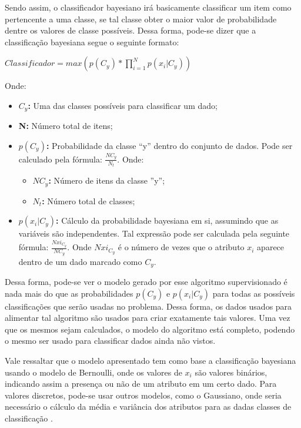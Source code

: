 Sendo assim, o classificador bayesiano irá basicamente classificar um item
como pertencente a uma classe, se tal classe obter o maior valor de
probabilidade dentre os valores de classe possíveis. Dessa forma, pode-se
dizer que a classificação bayesiana segue o seguinte formato:

$Classificador = max(p(C_{y})*\prod_{i=1}^{N}p(x_{i}|C_{y}))$

Onde:

\begin{itemize}
    \item \textbf{$C_{y}$: } Uma das classes possíveis para classificar um
    dado;
    \item \textbf{N: } Número total de itens;
    \item \textbf{$p(C_{y})$: } Probabilidade da classe ``y'' dentro do
    conjunto de dados. Pode ser calculado pela
    fórmula: $\frac{NC_{y}}{N_{t}}$.
    Onde:
      \begin{itemize}
          \item \textbf{$NC_{y}$: } Número de itens da classe ''y'';
          \item \textbf{$N_{t}$: } Número total de classes;
      \end{itemize}
    \item \textbf{$p(x_{i}|C_{y})$: } Cálculo da probabilidade bayesiana
    em si, assumindo que as variáveis são independentes. Tal expressão
    pode ser calculada pela seguinte fórmula: $\frac{Nxi_{C_{y}}}{NC_{y}}$.
    Onde $Nxi_{C_{y}}$ é o número de vezes que o atributo $x_{i}$ aparece
    dentro de um dado marcado como $C_{y}$.
\end{itemize}

Dessa forma, pode-se ver o modelo gerado por esse algoritmo supervisionado
é nada mais do que as probabilidades $p(C_{y})$ e $p(x_{i}|C_{y})$ para
todas as possíveis classificações que serão usadas no problema. Dessa forma,
os dados usados para alimentar tal algoritmo são usados para criar exatamente tais
valores. Uma vez que os mesmos sejam calculados, o modelo do algoritmo está completo,
podendo o mesmo ser usado para classificar dados ainda não vistos.

Vale ressaltar que o modelo apresentado tem como base a classificação
bayesiana usando o modelo de Bernoulli, onde os valores de $x_{i}$ são valores
binários, indicando assim a presença ou não de um atributo em um certo dado.
Para valores discretos, pode-se usar outros modelos, como o Gaussiano, onde
seria necessário o cálculo da média e variância dos atributos para as dadas
classes de classificação \cite{zhang2004optimality}.

